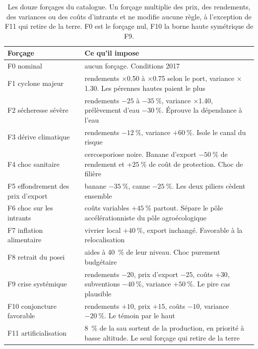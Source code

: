 \begin{table}[H]
  \centering
  \caption{Les douze forçages du catalogue. Un forçage multiplie des prix, des rendements, des
  variances ou des coûts d'intrants et ne modifie aucune règle, à l'exception de F11 qui retire
  de la terre. F0 est le forçage nul, F10 la borne haute symétrique de F9.}
  \label{tab:ann-forcages}
  \scriptsize
  \setlength{\tabcolsep}{4pt}
  \begin{tabularx}{\textwidth}{@{}p{31mm}X@{}}
    \toprule
    \textbf{Forçage} & \textbf{Ce qu'il impose} \\
    \midrule
    F0 nominal & aucun forçage. Conditions 2017 \\
    F1 cyclone majeur & rendements $\times$\num{0.50} à $\times$\num{0.75} selon le port,
      variance $\times$\num{1.30}. Les pérennes hautes paient le plus \\
    F2 sécheresse sévère & rendements $-\num{25}$ à $-\SI{35}{\percent}$, variance
      $\times$\num{1.40}, prélèvement d'eau $-\SI{30}{\percent}$. Éprouve la dépendance à
      l'eau \\
    F3 dérive climatique & rendements $-\SI{12}{\percent}$, variance $+\SI{60}{\percent}$.
      Isole le canal du risque \\
    F4 choc sanitaire & cercosporiose noire. Banane d'export $-\SI{50}{\percent}$ de rendement
      et $+\SI{25}{\percent}$ de coût de protection. Choc de filière \\
    F5 effondrement des prix d'export & banane $-\SI{35}{\percent}$, canne
      $-\SI{25}{\percent}$. Les deux piliers cèdent ensemble \\
    F6 choc sur les intrants & coûts variables $+\SI{45}{\percent}$ partout. Sépare le pôle
      accélérationniste du pôle agroécologique \\
    F7 inflation alimentaire & vivrier local $+\SI{40}{\percent}$, export inchangé. Favorable
      à la relocalisation \\
    F8 retrait du \gls{posei} & aides à \SI{40}{\percent} de leur niveau. Choc purement
      budgétaire \\
    F9 crise systémique & rendements $-\num{20}$, prix d'export $-\num{25}$, coûts $+\num{30}$,
      subventions $-\SI{40}{\percent}$, variance $+\SI{50}{\percent}$. Le pire cas plausible \\
    F10 conjoncture favorable & rendements $+\num{10}$, prix $+\num{15}$, coûts $-\num{10}$,
      variance $-\SI{20}{\percent}$. Le témoin par le haut \\
    F11 artificialisation & \SI{8}{\percent} de la \gls{sau} sortent de la production, en
      priorité à basse altitude. Le seul forçage qui retire de la terre \\
    \bottomrule
  \end{tabularx}
\end{table}

